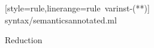 \begin{figure}
  
  [style=rule,linerange=rule\ varinst-(**)]
  {syntax/semanticsannotated.ml}
  \caption{Reduction}
\end{figure}


